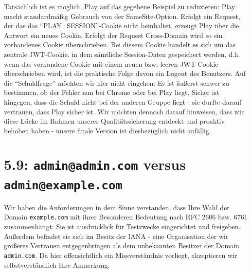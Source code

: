 \documentclass[12pt,DIV14,BCOR10mm,a4paper,parskip=half-,headsepline,headinclude,english,ngerman,bibliography=totocnumbered]{scrreprt}
\begin{document}
Tatsächlich ist es möglich, Play auf das gegebene Beispiel zu reduzieren: Play macht standardmäßig Gebrauch von der SameSite-Option. Erfolgt ein Request, der das das \enquote{PLAY\_SESSION}-Cookie nicht beinhaltet, erzeugt Play über die Antwort ein neues Cookie. Erfolgt der Request Cross-Domain wird so ein vorhandenes Cookie überschrieben. Bei diesem Cookie handelt es sich um das zentrale JWT-Cookie, in dem sämtliche Session-Daten gespeichert werden, d.h. wenn das vorhandene Cookie mit einem neuen bzw. leeren JWT-Cookie überschrieben wird, ist die praktische Folge davon ein Logout des Benutzers.\newline\newline
Auf die \enquote{Schuldfrage} möchten wir hier nicht eingehen: Es ist äußerst schwer zu bestimmen, ob der Fehler nun bei Chrome oder bei Play liegt. Sicher ist hingegen, dass die Schuld nicht bei der anderen Gruppe liegt - sie durfte darauf vertrauen, dass Play sicher ist. Wir möchten dennoch darauf hinweisen, dass wir diese Lücke im Rahmen unserer Qualitätssicherung entdeckt und proaktiv behoben haben - unsere finale Version ist diesbezüglich nicht anfällig.

\section{5.9: \texttt{admin@admin.com} versus \texttt{admin@example.com}}

Wir haben die Anforderungen in dem Sinne verstanden, dass Ihre Wahl der Domain \texttt{example.com} mit ihrer Besonderen Bedeutung nach RFC 2606 bzw. 6761 zusammenhängt: Sie ist ausdrücklick für Testzwecke eingerichtet und freigeben. Außerdem befindet sie sich im Besitz der IANA - eine Organisation der wir größeres Vertrauen entgegenbringen als dem unbekannten Besitzer der Domain \texttt{admin.com}.
Da hier offensichtlich ein Missverständnis vorliegt, akzeptieren wir selbstverständlich Ihre Anmerkung.



\printbibliography

\printacronyms[title=Abkürzungsverzeichnis,toctitle=Abkürzungsverzeichnis]
\printglossary[title=Glossar,toctitle=Glossar,type=main]

\iftotalfigures
  \listoffigures
\fi

\end{document}
